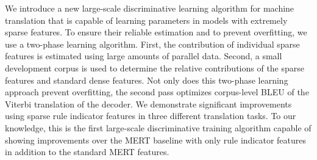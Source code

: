 We introduce a new large-scale discriminative learning algorithm for machine translation that is capable of learning parameters in models with extremely
 sparse features. To ensure their reliable estimation and to prevent
 overfitting, we use a two-phase learning algorithm. First, the contribution of
 individual sparse features is estimated using large amounts of parallel data.
 Second, a small development corpus is used to determine the relative
 contributions of the sparse features and standard dense features. Not only does
 this two-phase learning approach prevent overfitting, the second pass optimizes
 corpus-level BLEU of the Viterbi translation of the decoder. We demonstrate
 significant improvements using sparse rule indicator features in three
 different translation tasks. To our knowledge, this is the first large-scale
 discriminative training algorithm capable of showing improvements over the MERT
 baseline with only rule indicator features in addition to the standard MERT
 features.

